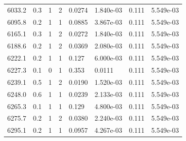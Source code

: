 \documentclass[preview]{standalone}
\begin{document}
{{{{{{{{{\begin{tabular}{L{1.2cm}C{1.2cm} C{0.3cm}C{0.5cm} C{1.4cm}C{1.4cm} C{1.4cm}C{1.4cm}}
  6033.2  &   0.3  & 1     &  2 &  0.0274  & 1.840e-03  & 0.111 &  5.549e-03   \\ 
  6095.8  &   0.2  & 1     &  1 &  0.0885  & 3.867e-03  & 0.111 &  5.549e-03   \\ 
  6165.1  &   0.3  & 1     &  2 &  0.0272  & 1.840e-03  & 0.111 &  5.549e-03   \\ 
  6188.6  &   0.2  & 1     &  2 &  0.0369  & 2.080e-03  & 0.111 &  5.549e-03   \\ 
  6222.1  &   0.2  & 1     &  1 &  0.127  & 6.000e-03  & 0.111 &  5.549e-03   \\ 
  6227.3  &   0.1  & 0     &  1 &  0.353  & 0.0111  & 0.111 &  5.549e-03   \\ 
  6239.1  &   0.5  & 1     &  2 &  0.0190  & 1.520e-03  & 0.111 &  5.549e-03   \\ 
  6248.0  &   0.6  & 1     &  1 &  0.0239  & 2.133e-03  & 0.111 &  5.549e-03   \\ 
  6265.3  &   0.1  & 1     &  1 &  0.129  & 4.800e-03  & 0.111 &  5.549e-03   \\ 
  6275.7  &   0.2  & 1     &  2 &  0.0380  & 2.240e-03  & 0.111 &  5.549e-03   \\ 
  6295.1  &   0.2  & 1     &  1 &  0.0957  & 4.267e-03  & 0.111 &  5.549e-03   \\ 
\hline 
\end{tabular} 

}}}}}}}}}
\end{document}
